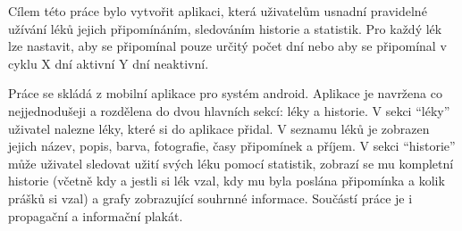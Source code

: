 \documentclass[../TakeYourPill.tex]{subfiles}
\begin{document}
Cílem této práce bylo vytvořit aplikaci, která uživatelům usnadní pravidelné užívání léků jejich připomínáním, sledováním historie a statistik. Pro každý lék lze nastavit, aby se připomínal pouze určitý počet dní nebo aby se připomínal v cyklu X dní aktivní Y dní neaktivní.

Práce se skládá z mobilní aplikace pro systém android. Aplikace je navržena co nejjednodušeji a rozdělena do dvou hlavních sekcí: léky a historie. V sekci \enquote{léky} uživatel nalezne léky, které si do aplikace přidal. V seznamu léků je zobrazen jejich název, popis, barva, fotografie, časy připomínek a příjem. V sekci \enquote{historie} může uživatel sledovat užití svých léku pomocí statistik, zobrazí se mu kompletní historie (včetně kdy a jestli si lék vzal, kdy mu byla poslána připomínka a kolik prášků si vzal) a grafy zobrazující souhrnné informace. Součástí práce je i propagační a informační plakát.
\end{document}

